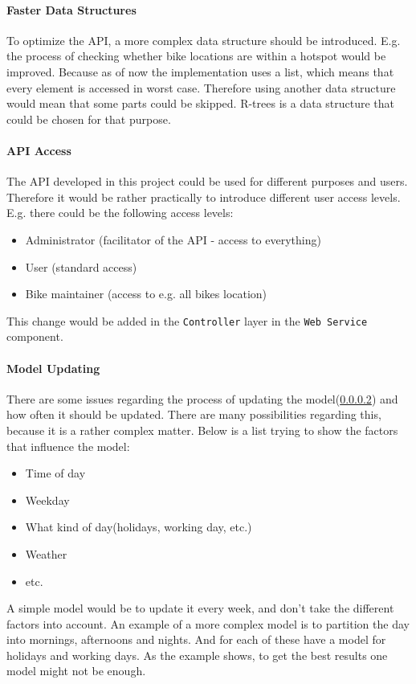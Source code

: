 \paragraph{Faster Data Structures}
To optimize the API, a more complex data structure should be introduced.
E.g. the process of checking whether bike locations are within a hotspot would be improved.
Because as of now the implementation uses a list, which means that every element is accessed in worst case.
Therefore using another data structure would mean that some parts could be skipped.
R-trees\cite[Section 25.3.5.3]{database_system_concepts} is a data structure that could be chosen for that purpose.

\paragraph{API Access}
The API developed in this project could be used for different purposes and users.
Therefore it would be rather practically to introduce different user access levels.
E.g. there could be the following access levels:
\begin{itemize}
\item Administrator (facilitator of the API - access to everything)
\item User (standard access)
\item Bike maintainer (access to e.g. all bikes location)
\end{itemize}
This change would be added in the \texttt{Controller} layer in the \texttt{Web Service} component.

\paragraph{Model Updating}\label{reflection:model_updating}
There are some issues regarding the process of updating the model(\cref{}) and how often it should be updated.
There are many possibilities regarding this, because it is a rather complex matter.
Below is a list trying to show the factors that influence the model:
\begin{itemize}
\item Time of day
\item Weekday
\item What kind of day(holidays, working day, etc.)
\item Weather
\item etc.
\end{itemize}
A simple model would be to update it every week, and don't take the different factors into account.
An example of a more complex model is to partition the day into mornings, afternoons and nights.
And for each of these have a model for holidays and working days.
As the example shows, to get the best results one model might not be enough. 

